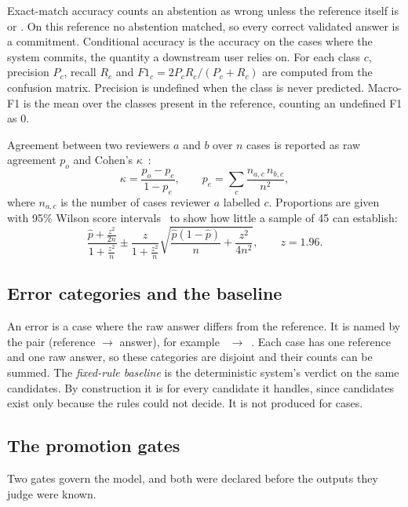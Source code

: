 Exact-match accuracy counts an abstention as wrong unless the reference itself is \AM{} or \IE. On this reference no abstention matched, so every correct validated answer is a commitment. Conditional accuracy is the accuracy on the cases where the system commits, the quantity a downstream user relies on. For each class $c$, precision $P_c$, recall $R_c$ and $F1_c = 2P_cR_c/(P_c+R_c)$ are computed from the confusion matrix. Precision is undefined when the class is never predicted. Macro-F1 is the mean over the classes present in the reference, counting an undefined F1 as 0.

Agreement between two reviewers $a$ and $b$ over $n$ cases is reported as raw agreement $p_o$ and Cohen's $\kappa$~\cite{cohen1960}:
\begin{equation}
\kappa = \frac{p_o - p_e}{1 - p_e}, \qquad p_e = \sum_{c} \frac{n_{a,c}\, n_{b,c}}{n^2},
\label{eq:kappa}
\end{equation}
where $n_{a,c}$ is the number of cases reviewer $a$ labelled $c$. Proportions are given with 95\% Wilson score intervals~\cite{wilson1927} to show how little a sample of 45 can establish:
\begin{equation}
\frac{\hat{p} + \frac{z^2}{2n}}{1+\frac{z^2}{n}} \pm \frac{z}{1+\frac{z^2}{n}}\sqrt{\frac{\hat{p}(1-\hat{p})}{n} + \frac{z^2}{4n^2}}, \qquad z = 1.96.
\label{eq:wilson}
\end{equation}

\subsection{Error categories and the baseline}

An error is a case where the raw answer differs from the reference. It is named by the pair (reference $\rightarrow$ answer), for example \CH~$\rightarrow$~\SC. Each case has one reference and one raw answer, so these categories are disjoint and their counts can be summed. The \emph{fixed-rule baseline} is the deterministic system's verdict on the same candidates. By construction it is \AM{} for every candidate it handles, since candidates exist only because the rules could not decide. It is not produced for  cases.

\subsection{The promotion gates}

Two gates govern the model, and both were declared before the outputs they judge were known.

